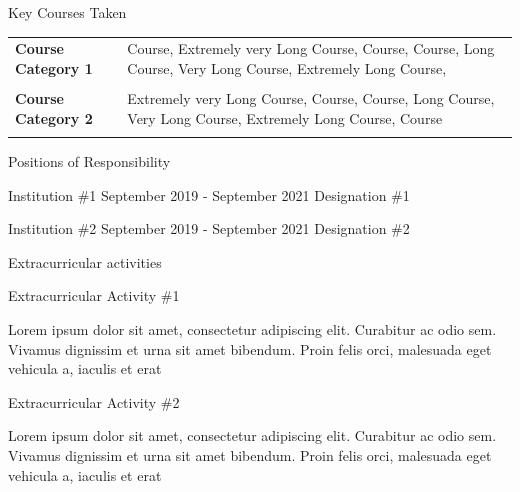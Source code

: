 \documentclass{resume} %
\makeatletter
\newcommand{\plainitem}[1]{\item{#1}}
\newcommand{\entry}[2]{#1 & #2 \tabularnewline} %
\newcommand{\tableEnv}[2]{%
  \begin{rSection}{#1} %
    \begin{adjustwidth}{0.0in}{0.1in} %
      \begin{tabularx}{\linewidth}{@{} >{\bfseries}l @{\hspace{6ex}} X @{}}
        #2 %
      \end{tabularx}
    \end{adjustwidth}
  \end{rSection}
}
\makeatother
\begin{document}
\tableEnv{Key Courses Taken}{
    \entry{Course Category 1}
    {   
        Course, Extremely very Long Course, Course, Course, Long Course, Very Long Course, Extremely Long Course, 
    }
    \entry{}{\vspace{1em}}
    
    \entry{Course Category 2}
    {   
        Extremely very Long Course, Course, Course, Long Course, Very Long Course, Extremely Long Course, Course
    }
    \entry{}{\vspace{1em}}

}


\begin{rSection}{Positions of Responsibility}
    \begin{rSubsectionNoBullet}
    {Institution \#1}
    {September 2019 - September 2021}
    {Designation \#1}
    {}\item \vspace{-1em}
    \end{rSubsectionNoBullet}

    \begin{rSubsectionNoBullet}
    {Institution \#2}
    {September 2019 - September 2021}
    {Designation \#2}
    {}\item \vspace{-1em}
    \end{rSubsectionNoBullet}
    
\end{rSection}


\begin{rSection}{Extracurricular activities}

\begin{rSubsectionNoBullet}
    {Extracurricular Activity \#1}
    {}
    {}
    {}
    \plainitem{Lorem ipsum dolor sit amet, consectetur adipiscing elit. Curabitur ac odio sem. Vivamus dignissim et urna sit amet bibendum. Proin felis orci, malesuada eget vehicula a, iaculis et erat}
\end{rSubsectionNoBullet}

\begin{rSubsectionNoBullet}
    {Extracurricular Activity \#2}
    {}
    {}
    {}
    \plainitem{Lorem ipsum dolor sit amet, consectetur adipiscing elit. Curabitur ac odio sem. Vivamus dignissim et urna sit amet bibendum. Proin felis orci, malesuada eget vehicula a, iaculis et erat}
\end{rSubsectionNoBullet}

\end{rSection}
\end{document}
